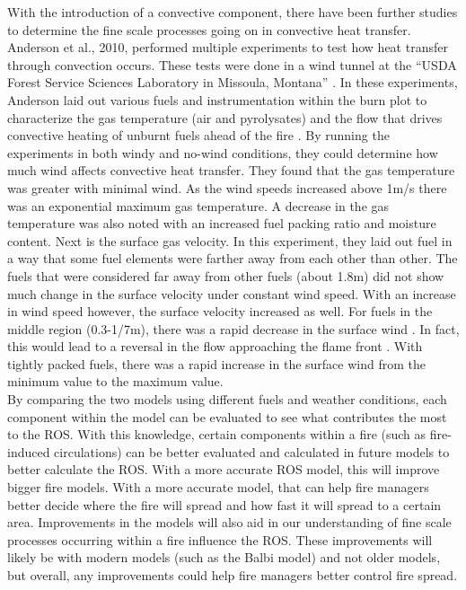 \documentclass{article}
\begin{document}
\indent With the introduction of a convective component, there have been further studies to determine the fine scale processes going on in convective heat transfer. Anderson et al., 2010, performed multiple experiments to test how heat transfer through convection occurs. These tests were done in a wind tunnel at the “USDA Forest Service Sciences Laboratory in Missoula, Montana” \citep{Anderson2010}. In these experiments, Anderson laid out various fuels and instrumentation within the burn plot to characterize the gas temperature (air and pyrolysates) and the flow that drives convective heating of unburnt fuels ahead of the fire \citep{Anderson2010}. By running the experiments in both windy and no-wind conditions, they could determine how much wind affects convective heat transfer. They found that the gas temperature was greater with minimal wind. As the wind speeds increased above 1m/s there was an exponential maximum gas temperature. A decrease in the gas temperature was also noted with an increased fuel packing ratio and moisture content. Next is the surface gas velocity. In this experiment, they laid out fuel in a way that some fuel elements were farther away from each other than other. The fuels that were considered far away from other fuels (about 1.8m) did not show much change in the surface velocity under constant wind speed. With an increase in wind speed however, the surface velocity increased as well. For fuels in the middle region (0.3-1/7m), there was a rapid decrease in the surface wind \citep{Anderson2010}. In fact, this would lead to a reversal in the flow approaching the flame front \citep{Anderson2010}. With tightly packed fuels, there was a rapid increase in the surface wind from the minimum value to the maximum value. \\
\indent By comparing the two models using different fuels and weather conditions, each component within the model can be evaluated to see what contributes the most to the ROS. With this knowledge, certain components within a fire (such as fire-induced circulations) can be better evaluated and calculated in future models to better calculate the ROS. With a more accurate ROS model, this will improve bigger fire models. With a more accurate model, that can help fire managers better decide where the fire will spread and how fast it will spread to a certain area. Improvements in the models will also aid in our understanding of fine scale processes occurring within a fire influence the ROS. These improvements will likely be with modern models (such as the Balbi model) and not older models, but overall, any improvements could help fire managers better control fire spread. \\
\end{document}
